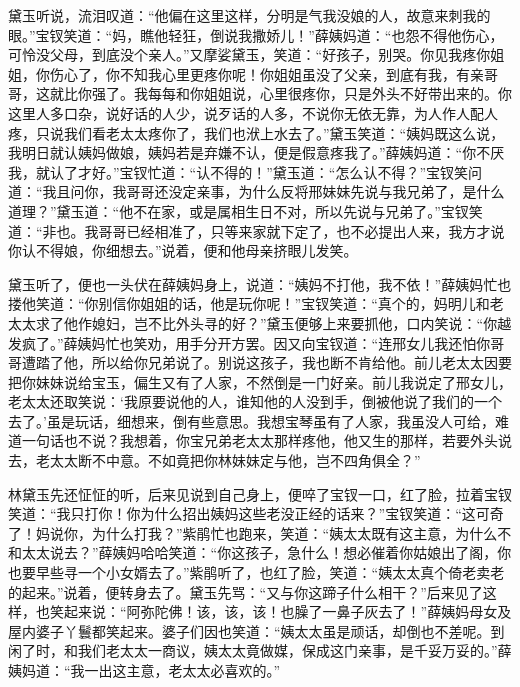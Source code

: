 \documentclass[12pt,oneside]{book}
\begin{document}
黛玉听说，流泪叹道：“他偏在这里这样，分明是气我没娘的人，故意来刺我的眼。”宝钗笑道：“妈，瞧他轻狂，倒说我撒娇儿！”薛姨妈道：“也怨不得他伤心，可怜没父母，到底没个亲人。”又摩娑黛玉，笑道：“好孩子，别哭。你见我疼你姐姐，你伤心了，你不知我心里更疼你呢！你姐姐虽没了父亲，到底有我，有亲哥哥，这就比你强了。我每每和你姐姐说，心里很疼你，只是外头不好带出来的。你这里人多口杂，说好话的人少，说歹话的人多，不说你无依无靠，为人作人配人疼，只说我们看老太太疼你了，我们也洑上水去了。”黛玉笑道：“姨妈既这么说，我明日就认姨妈做娘，姨妈若是弃嫌不认，便是假意疼我了。”薛姨妈道：“你不厌我，就认了才好。”宝钗忙道：“认不得的！”黛玉道：“怎么认不得？”宝钗笑问道：“我且问你，我哥哥还没定亲事，为什么反将邢妹妹先说与我兄弟了，是什么道理？”黛玉道：“他不在家，或是属相生日不对，所以先说与兄弟了。”宝钗笑道：“非也。我哥哥已经相准了，只等来家就下定了，也不必提出人来，我方才说你认不得娘，你细想去。”说着，便和他母亲挤眼儿发笑。

黛玉听了，便也一头伏在薛姨妈身上，说道：“姨妈不打他，我不依！”薛姨妈忙也搂他笑道：“你别信你姐姐的话，他是玩你呢！”宝钗笑道：“真个的，妈明儿和老太太求了他作媳妇，岂不比外头寻的好？”黛玉便够上来要抓他，口内笑说：“你越发疯了。”薛姨妈忙也笑劝，用手分开方罢。因又向宝钗道：“连邢女儿我还怕你哥哥遭踏了他，所以给你兄弟说了。别说这孩子，我也断不肯给他。前儿老太太因要把你妹妹说给宝玉，偏生又有了人家，不然倒是一门好亲。前儿我说定了邢女儿，老太太还取笑说：‘我原要说他的人，谁知他的人没到手，倒被他说了我们的一个去了。’虽是玩话，细想来，倒有些意思。我想宝琴虽有了人家，我虽没人可给，难道一句话也不说？我想着，你宝兄弟老太太那样疼他，他又生的那样，若要外头说去，老太太断不中意。不如竟把你林妹妹定与他，岂不四角俱全？”

林黛玉先还怔怔的听，后来见说到自己身上，便啐了宝钗一口，红了脸，拉着宝钗笑道：“我只打你！你为什么招出姨妈这些老没正经的话来？”宝钗笑道：“这可奇了！妈说你，为什么打我？”紫鹃忙也跑来，笑道：“姨太太既有这主意，为什么不和太太说去？”薛姨妈哈哈笑道：“你这孩子，急什么！想必催着你姑娘出了阁，你也要早些寻一个小女婿去了。”紫鹃听了，也红了脸，笑道：“姨太太真个倚老卖老的起来。”说着，便转身去了。黛玉先骂：“又与你这蹄子什么相干？”后来见了这样，也笑起来说：“阿弥陀佛！该，该，该！也臊了一鼻子灰去了！”薛姨妈母女及屋内婆子丫鬟都笑起来。婆子们因也笑道：“姨太太虽是顽话，却倒也不差呢。到闲了时，和我们老太太一商议，姨太太竟做媒，保成这门亲事，是千妥万妥的。”薛姨妈道：“我一出这主意，老太太必喜欢的。”
\end{document}
